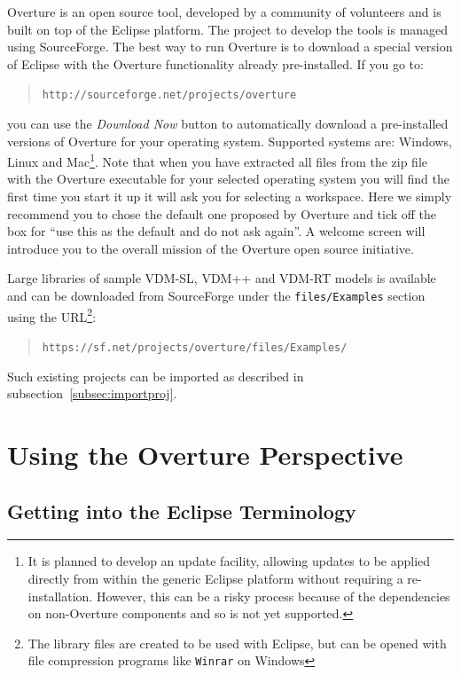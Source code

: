 \documentclass{overturerep}
\newcommand{\url}[1]{\texttt{#1}}
\begin{document}
{Overture is an open source tool, developed by a community of volunteers 
and is built on top of the Eclipse platform. The project to develop the tools 
is managed using SourceForge.  The best way to run Overture is to download 
a special version of Eclipse with the Overture functionality already pre-installed. If you go to:
  \begin{quote}
  \url{http://sourceforge.net/projects/overture}
  \end{quote}
  \noindent you can use the \textit{Download Now} button to
  automatically download a pre-installed versions of Overture for your
  operating system.  Supported systems are: Windows, Linux and
  Mac\footnote{It is planned to develop an update facility, allowing
    updates to be applied directly from within the generic Eclipse
    platform without requiring a re-installation. However, this can be
    a risky process because of the dependencies on non-Overture
    components and so is not yet supported.}.
Note that when you have extracted all files from the zip file with the
Overture executable for your selected operating system you will find
the first time you start it up it will ask you for selecting a
workspace. Here we simply recommend you to chose the default one proposed 
by Overture and tick off the box for ``use this as the default and do
not ask again''. A welcome screen will introduce you to the overall 
mission of the Overture open source initiative. 

Large libraries of sample VDM-SL, VDM++ and VDM-RT models is available
and can be downloaded from SourceForge under the
\texttt{files/Examples} section using the URL\footnote{The library
  files are created to be used with Eclipse, but can be opened with
  file compression programs like \texttt{Winrar} on Windows}:
\begin{quote}
\url{https://sf.net/projects/overture/files/Examples/}
\end{quote}
Such existing projects can be imported as described in
subsection~\ref{subsec:importproj}. 

\section{Using the Overture Perspective}\label{sec:vdmsupport}

\subsection{Getting into the Eclipse Terminology}

}
\end{document}
